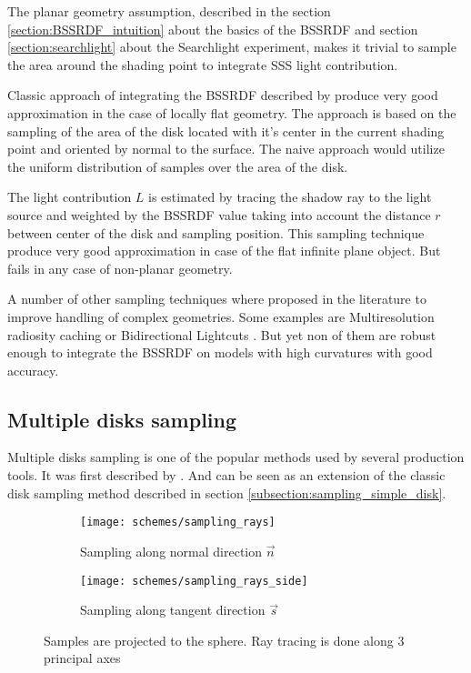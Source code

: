 The planar geometry assumption, described in the section \ref{section:BSSRDF_intuition} about the
basics of the BSSRDF and section \ref{section:searchlight} about the  Searchlight experiment, makes
it trivial to sample the area around the shading point to integrate SSS light contribution.

Classic approach of integrating the BSSRDF described by \cite{Jensen:2001:PMS:383259.383319} 
produce very good approximation in the case of locally flat geometry. The approach is based on the
sampling of the area of the disk located with it's center in the current shading point and oriented
by normal to the surface. The naive approach would utilize the uniform distribution of samples over
the area of the disk.

The light contribution $L$ is estimated by tracing the shadow ray to the light source and
weighted by the BSSRDF value taking into account the distance $r$ between center of the disk and
sampling position. This sampling technique produce very good approximation in case of the flat
infinite plane object. But fails in any case of non-planar geometry.

A number of other sampling techniques where proposed in the literature to improve handling of
complex geometries. Some examples are Multiresolution radiosity caching
\cite{Christensen:2012:MRC:2343045.2343108} or Bidirectional Lightcuts
\cite{Walter:2012:BL:2185520.2185555}. But yet non of them are robust enough to integrate the BSSRDF
on models with high curvatures with good accuracy.

\subsection{Multiple disks sampling}
Multiple disks sampling is one of the popular methods used by several production tools. It was first
described by \cite{King:2013:BIS:2504459.2504520}. And can be seen as an extension of the classic
disk sampling method described in section \ref{subsection:sampling_simple_disk}.
\begin{figure}[h]
    \centering
    \begin{subfigure}{0.45\textwidth}
        \texttt{[image: schemes/sampling\_rays]}
        \caption{Sampling along normal direction $\vec{n}$}
        \label{fig:sampling_rays_n}
    \end{subfigure}
    \quad
    \begin{subfigure}{0.45\textwidth}
        \texttt{[image: schemes/sampling\_rays\_side]}
        \caption{Sampling along tangent direction $\vec{s}$}
    \end{subfigure}
    \caption{Samples are projected to the sphere. Ray tracing is done along 3 principal axes}
    \label{fig:sampling_rays}
\end{figure}

